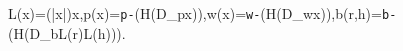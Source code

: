L(x)=(|x|)\mathbin{\Vert}x,\qquad p(x)=\texttt{p-}\mathbin{\Vert}\!\left(H(D_p\mathbin{\Vert}x)\right),\qquad w(x)=\texttt{w-}\mathbin{\Vert}\!\left(H(D_w\mathbin{\Vert}x)\right),\qquad b(r,h)=\texttt{b-}\mathbin{\Vert}\!\left(H(D_b\mathbin{\Vert}L(r)\mathbin{\Vert}L(h))\right).
